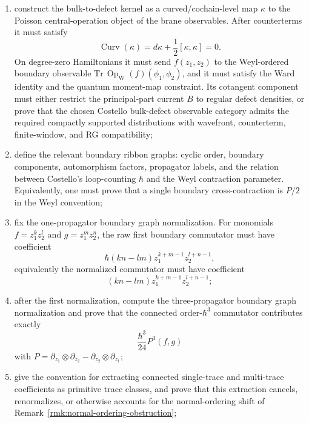 \documentclass[11pt]{memoir}
\begin{document}
\begin{prob}
\begin{enumerate}
$$	        +(Q+\{I_0,-\})C=0.$$
	      The proved local mechanisms here are the specified supertrace and
	      central-character normalizations; any exhaustive classification is
	      controlled by the displayed obstruction complex;
	    \item construct the bulk-to-defect kernel as a curved/cochain-level map
	      \(\kappa\) to the Poisson central-operation object of the brane
	      observables. After counterterms it must satisfy
	      \[
	        \operatorname{Curv}(\kappa)
	          =d\kappa+\frac12[\kappa,\kappa]=0.
	      \]
	      On degree-zero Hamiltonians it must send \(f(z_1,z_2)\) to the
	      Weyl-ordered boundary observable
	      \(\mathrm{Tr}\,\operatorname{Op}_{\mathrm W}(f)(\phi_1,\phi_2)\),
	      and it must satisfy the Ward identity and the quantum moment-map
	      constraint. Its cotangent component must either restrict the
	      principal-part current \(B\) to regular defect densities, or prove
	      that the chosen Costello bulk-defect observable category admits the
	      required compactly supported distributions with wavefront,
	      counterterm, finite-window, and RG compatibility;
    \item define the relevant boundary ribbon graphs: cyclic order, boundary
      components, automorphism factors, propagator labels, and the relation
      between Costello's loop-counting $\hbar$ and the Weyl contraction
      parameter. Equivalently, one must prove that a single boundary
      cross-contraction is $P/2$ in the Weyl convention;
    \item fix the one-propagator boundary graph normalization. For monomials
      $f=z_1^kz_2^l$ and $g=z_1^mz_2^n$, the raw first boundary commutator must
      have coefficient
      $$\hbar(kn-lm)z_1^{k+m-1}z_2^{l+n-1},$$
      equivalently the normalized commutator must have coefficient
      $$(kn-lm)z_1^{k+m-1}z_2^{l+n-1};$$
    \item after the first normalization, compute the three-propagator boundary
      graph normalization and prove that the connected order-$\hbar^3$
      commutator contributes exactly
      $$\frac{\hbar^3}{24}P^3(f,g)$$
      with $P=\partial_{z_1}\otimes\partial_{z_2}
      -\partial_{z_2}\otimes\partial_{z_1}$;
	    \item give the convention for extracting connected single-trace and
	      multi-trace coefficients as primitive trace classes, and
	      prove that this extraction cancels, renormalizes, or otherwise accounts
	      for the normal-ordering shift of
	      Remark~\ref{rmk:normal-ordering-obstruction};

\end{enumerate}
\end{prob}
\end{document}
